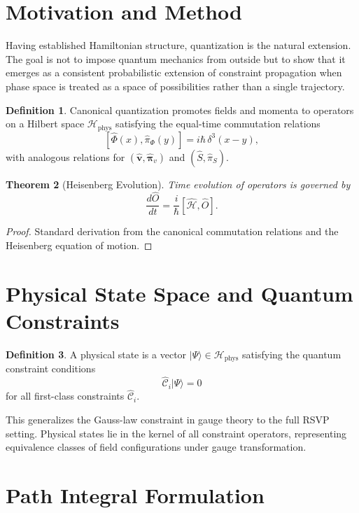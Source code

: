 \documentclass[12pt,a4paper,openany]{book}
\theoremstyle{plain}
\newtheorem{theorem}{Theorem}[chapter]
\theoremstyle{definition}
\newtheorem{definition}[theorem]{Definition}
\theoremstyle{remark}
\begin{document}
\section{Motivation and Method}

Having established Hamiltonian structure, quantization is the natural extension. The goal is not to impose quantum mechanics from outside but to show that it emerges as a consistent probabilistic extension of constraint propagation when phase space is treated as a space of possibilities rather than a single trajectory.

\begin{definition}
Canonical quantization promotes fields and momenta to operators on a Hilbert space $\mathcal{H}_{\mathrm{phys}}$ satisfying the equal-time commutation relations
\[
[\hat{\Phi}(x), \hat{\pi}_\Phi(y)] = i\hbar\,\delta^3(x-y),
\]
with analogous relations for $(\hat{\mathbf{v}},\hat{\boldsymbol{\pi}}_v)$ and $(\hat{S},\hat{\pi}_S)$.
\end{definition}

\begin{theorem}[Heisenberg Evolution]
\label{thm:heisenberg}
Time evolution of operators is governed by
\[
\frac{d\hat{O}}{dt} = \frac{i}{\hbar}[\hat{\mathcal{H}},\hat{O}].
\]
\end{theorem}

\begin{proof}
Standard derivation from the canonical commutation relations and the Heisenberg equation of motion.
\end{proof}

\section{Physical State Space and Quantum Constraints}

\begin{definition}
A physical state is a vector $|\Psi\rangle \in \mathcal{H}_{\mathrm{phys}}$ satisfying the quantum constraint conditions
\[
\hat{\mathcal{C}}_i|\Psi\rangle = 0
\]
for all first-class constraints $\hat{\mathcal{C}}_i$.
\end{definition}

This generalizes the Gauss-law constraint in gauge theory to the full RSVP setting. Physical states lie in the kernel of all constraint operators, representing equivalence classes of field configurations under gauge transformation.

\section{Path Integral Formulation}
\end{document}
